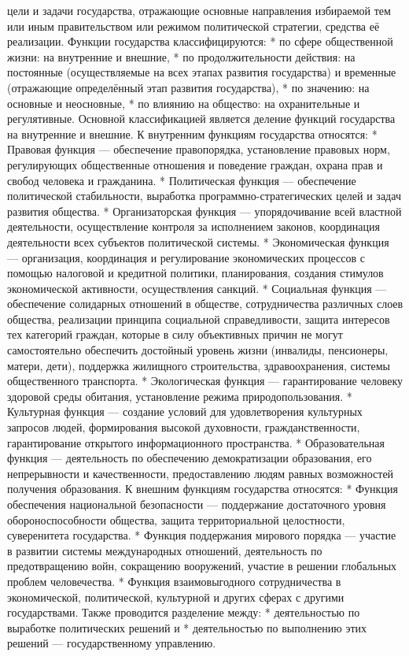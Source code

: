 \documentclass[12pt]{article}
\begin{document}
цели и задачи государства, отражающие основные направления избираемой тем или иным правительством или
режимом политической стратегии, средства её реализации.
Функции государства классифицируются:
* по сфере общественной жизни: на внутренние и внешние,
* по продолжительности действия: на постоянные (осуществляемые на всех этапах развития государства) и
временные (отражающие определённый этап развития государства),
* по значению: на основные и неосновные,
* по влиянию на общество: на охранительные и регулятивные.
Основной классификацией является деление функций государства на внутренние и внешние. К внутренним
функциям государства относятся:
* Правовая функция — обеспечение правопорядка, установление правовых норм, регулирующих общественные
отношения и поведение граждан, охрана прав и свобод человека и гражданина.
* Политическая функция — обеспечение политической стабильности, выработка программно-стратегических
целей и задач развития общества.
*  Организаторская  функция  —  упорядочивание  всей  властной  деятельности,  осуществление  контроля  за
исполнением законов, координация деятельности всех субъектов политической системы.
* Экономическая функция — организация, координация и регулирование экономических процессов с помощью
налоговой и кредитной политики, планирования, создания стимулов экономической активности, осуществления
санкций.
* Социальная функция — обеспечение солидарных отношений в обществе, сотрудничества различных слоев
общества, реализации принципа социальной справедливости, защита интересов тех категорий граждан, которые
в  силу  объективных  причин  не  могут  самостоятельно  обеспечить  достойный  уровень  жизни  (инвалиды,
пенсионеры, матери, дети), поддержка жилищного строительства, здравоохранения, системы общественного
транспорта.
*  Экологическая  функция  —  гарантирование  человеку  здоровой  среды  обитания,  установление  режима
природопользования.
* Культурная функция — создание условий для удовлетворения культурных запросов людей, формирования
высокой духовности, гражданственности, гарантирование открытого информационного пространства.
* Образовательная функция — деятельность по обеспечению демократизации образования, его непрерывности
и качественности, предоставлению людям равных возможностей получения образования.
К внешним функциям государства относятся:
* Функция обеспечения национальной безопасности — поддержание достаточного уровня обороноспособности
общества, защита территориальной целостности, суверенитета государства.
*  Функция  поддержания  мирового  порядка  —  участие  в  развитии  системы  международных  отношений,
деятельность по предотвращению войн, сокращению вооружений, участие в решении глобальных проблем
человечества.
* Функция взаимовыгодного сотрудничества в экономической, политической, культурной и других сферах с
другими государствами.
Также проводится разделение между:
* деятельностью по выработке политических решений и
* деятельностью по выполнению этих решений — государственному управлению.
\end{document}
